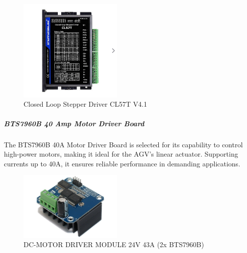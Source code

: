 \documentclass[../../main]{subfiles}
\begin{document}
    

\begin{figure}[H]
    \centering
    \includegraphics[width=0.45\textwidth]{fig/stepper_driver.png}
    \caption{ Closed Loop Stepper Driver CL57T V4.1 }
    \label{Stepper motor driver } %
\end{figure}

\subparagraph{BTS7960B 40 Amp Motor Driver Board}

The BTS7960B 40A Motor Driver Board is selected for its capability to control 
high-power motors, making it ideal for the AGV’s linear actuator. 
Supporting currents up to 40A, it ensures reliable performance in demanding applications. 

\begin{figure}[H]
    \centering
    \includegraphics[width=0.45\textwidth]{fig/40_amp_driver.jpg}
    \caption{ DC-MOTOR DRIVER MODULE 24V 43A (2x BTS7960B) }
    \label{Linear actuator driver } %
\end{figure}
\end{document}
